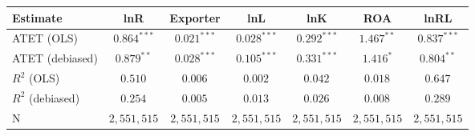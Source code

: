 \begin{tabular}{l*{6}{c}}
\hline\hline
 Estimate & lnR & Exporter & lnL & lnK & ROA & lnRL \\
\hline
ATET (OLS) & $0.864^{***}$ & $0.021^{***}$ & $0.028^{***}$ & $0.292^{***}$ & $1.467^{**}$ & $0.837^{***}$ \\
ATET (debiased) & $0.879^{**}$ & $0.028^{***}$ & $0.105^{***}$ & $0.331^{***}$ & $1.416^{*}$ & $0.804^{**}$ \\
\addlinespace $ R^2$ (OLS) & $0.510^{}$ & $0.006^{}$ & $0.002^{}$ & $0.042^{}$ & $0.018^{}$ & $0.647^{}$ \\
$ R^2$ (debiased) & $0.254^{}$ & $0.005^{}$ & $0.013^{}$ & $0.026^{}$ & $0.008^{}$ & $0.289^{}$ \\
N & $2,551,515$ & $2,551,515$ & $2,551,515$ & $2,551,515$ & $2,551,515$ & $2,551,515$ \\
\hline\hline
\end{tabular}
